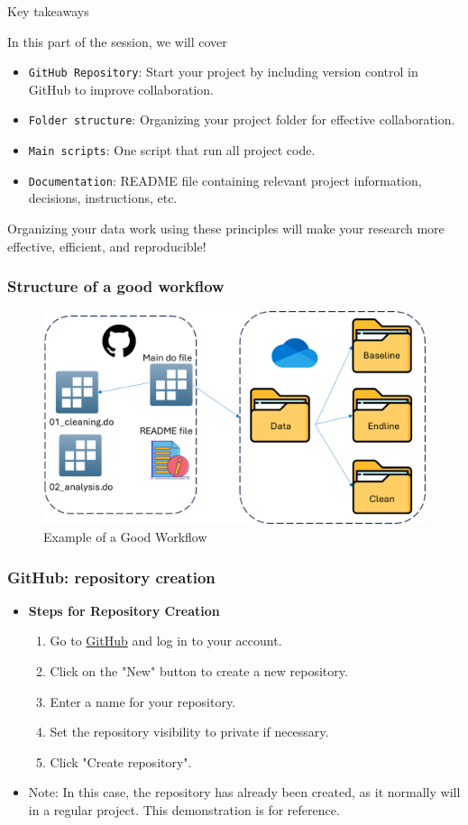 \documentclass[aspectratio=169]{beamer}
\begin{document}
\begin{frame}{Key takeaways}

	In this part of the session, we will cover
    \begin{itemize}
            \item \texttt{GitHub Repository}: Start your project by including version control in GitHub to improve collaboration.
	    \item \texttt{Folder structure}: Organizing your project folder for effective collaboration.
        \item \texttt{Main scripts}: One script that run all project code.
        \item \texttt{Documentation}: README file containing relevant project information, decisions, instructions, etc.
  \end{itemize}
   Organizing your data work using these principles will make your research more effective, efficient, and reproducible!

\end{frame}


\begin{frame}
\frametitle{Structure of a good workflow}
\begin{figure}[h!]
    \centering
    \includegraphics[width=0.8\linewidth]{img/structure_flow.png}
    \caption{Example of a Good Workflow}
\end{figure}
\end{frame}

\begin{frame}
\frametitle{GitHub: repository creation}
\begin{itemize}
    \item \textbf{Steps for Repository Creation}
    \begin{enumerate}
        \item Go to \href{https://github.com/}{GitHub} and log in to your account.
        \item Click on the "New" button to create a new repository.
        \item Enter a name for your repository.
        \item Set the repository visibility to private if necessary.
        \item Click "Create repository".
    \end{enumerate}
    \item Note: In this case, the repository has already been created, as it normally will in a regular project. This demonstration is for reference.
\end{itemize}
\end{frame}
\end{document}
